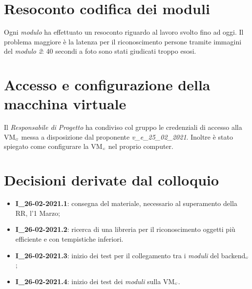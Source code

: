 \section{Resoconto codifica dei moduli}
Ogni \textit{modulo} ha effettuato un resoconto riguardo al lavoro svolto fino ad oggi.
Il problema maggiore è la latenza per il riconoscimento persone tramite immagini del \textit{modulo 2}: 40 secondi a foto sono stati giudicati troppo esosi.


\section{Accesso e configurazione della macchina virtuale}
Il \textit{Responsabile di Progetto} ha condiviso col gruppo le credenziali di accesso alla VM$_{\scaleto{G}{3pt}}$ messa a disposizione dal proponente \textit{v\_e\_25\_02\_2021}.
Inoltre è stato spiegato come configurare la VM$_{\scaleto{G}{3pt}}$ nel proprio computer.

\section{Decisioni derivate dal colloquio}
  \begin{itemize}
    \item \textbf{I\_26-02-2021.1}: consegna del materiale, necessario al superamento della RR, l'1 Marzo;
    \item \textbf{I\_26-02-2021.2}: ricerca di una libreria per il riconoscimento oggetti più efficiente e con tempistiche inferiori.
    \item \textbf{I\_26-02-2021.3}: inizio dei test per il collegamento tra i \textit{moduli} del backend$_{\scaleto{G}{3pt}}$;
    \item \textbf{I\_26-02-2021.4}: inizio dei test dei \textit{moduli} sulla VM$_{\scaleto{G}{3pt}}$.
  \end{itemize}
